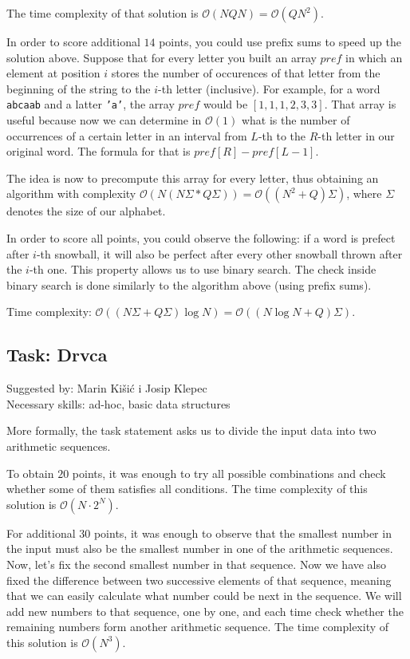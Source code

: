 \documentclass[a4paper]{article}
\begin{document}
The time complexity of that solution is $\mathcal{O}(NQN)=\mathcal{O}(QN^2)$.

In order to score additional $14$ points, you could use prefix sums to speed
up the solution above. Suppose that for every letter you built an array $pref$
in which an element at position $i$ stores the number of occurences of that
letter from the beginning of the string to the $i$-th letter (inclusive). For
example, for a word \texttt{abcaab} and a latter \texttt{'a'}, the array $pref$
would be $[1, 1, 1, 2, 3, 3]$. That array is useful because now we can determine
in $\mathcal{O}(1)$ what is the number of occurrences of a certain letter in
an interval from $L$-th to the $R$-th letter in our original word. The formula
for that is $pref[R]-pref[L-1]$.

The idea is now to precompute this array for every letter, thus obtaining an
algorithm with complexity $\mathcal{O}(N(N\Sigma * Q\Sigma))=
\mathcal{O}((N^2 + Q)\Sigma)$, where $\Sigma$ denotes the size of our
alphabet.

In order to score all points, you could observe the following: if a word is
prefect after $i$-th snowball, it will also be perfect after every other snowball
thrown after the $i$-th one. This property allows us to use binary search. The
check inside binary search is done similarly to the algorithm above (using
prefix sums).

Time complexity: $\mathcal{O}((N\Sigma + Q\Sigma)\log N) = \mathcal{O}((N \log N + Q)\Sigma)$.

\clearpage

\subsection*{Task: Drvca}
\textsf{Suggested by: Marin Kišić i Josip Klepec}\\
\textsf{Necessary skills: ad-hoc, basic data structures}

More formally, the task statement asks us to divide the input data into
two arithmetic sequences.

To obtain $20$ points, it was enough to try all possible combinations and
check whether some of them satisfies all conditions. The time complexity
of this solution is $\mathcal{O}(N \cdot 2^N)$.

For additional $30$ points, it was enough to observe that the smallest
number in the input must also be the smallest number in one of the
arithmetic sequences. Now, let's fix the second smallest number in that
sequence. Now we have also fixed the difference between two successive
elements of that sequence, meaning that we can easily calculate what number
could be next in the sequence. We will add new numbers to that sequence,
one by one, and each time check whether the remaining numbers form another
arithmetic sequence. The time complexity of this solution is $\mathcal{O}(N^3)$.
\end{document}
